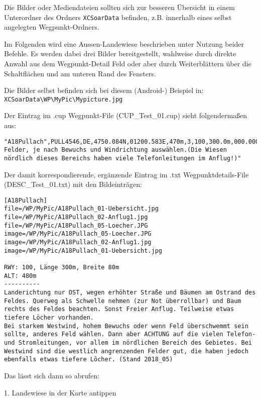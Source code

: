 Die Bilder oder Mediendateien sollten sich zur besseren Übersicht in einem Unterordner des Ordners \verb|XCSoarData| befinden, z.B. innerhalb eines selbst angelegten Wegpunkt-Ordners.



Im Folgenden wird eine Aussen-Landewiese beschrieben unter Nutzung beider Befehle. Es werden dabei drei Bilder bereitgestellt, wahlweise durch direkte Anwahl aus dem Wegpunkt-Detail Feld oder aber durch Weiterblättern über die Schaltflächen \button{$<$} und \button{$>$} am unteren Rand des Fensters. 

Die Bilder selbst befinden sich bei diesem (Android-) Beispiel in: \verb|XCSoarData\WP\MyPic\Mypicture.jpg| 

Der Eintrag im .cup Wegpunkt-File (CUP_Test_01.cup) sieht folgendermaßen aus:

\begin{verbatim}
"A18Pullach",PULL4546,DE,4750.084N,01200.583E,470m,3,100,300.0m,000.000,"Mehrere Felder, je nach Bewuchs und Windrichtung auswählen.(Die Wiesen nördlich dieses Bereichs haben viele Telefonleitungen im Anflug!)"
\end{verbatim}

Der damit korrespondierende, ergänzende Eintrag im .txt Wegpunktdetails-File (DESC_Test_01.txt) mit den Bildeinträgen:

\begin{verbatim}
[A18Pullach]
file=/WP/MyPic/A18Pullach_01-Uebersicht.jpg
file=/WP/MyPic/A18Pullach_02-Anflug1.jpg
file=/WP/MyPic/A18Pullach_05-Loecher.JPG
image=/WP/MyPic/A18Pullach_05-Loecher.JPG
image=/WP/MyPic/A18Pullach_02-Anflug1.jpg
image=/WP/MyPic/A18Pullach_01-Uebersicht.jpg

RWY: 100, Länge 300m, Breite 80m
ALT: 480m
----------
Landerichtung nur OST, wegen erhöhter Straße und Bäumen am Ostrand des Feldes. Querweg als Schwelle nehmen (zur Not überrollbar) und Baum rechts des Feldes beachten. Sonst Freier Anflug. Teilweise etwas tiefere Löcher vorhanden.
Bei starkem Westwind, hohem Bewuchs oder wenn Feld überschwemmt sein sollte, anderes Feld wählen. Dann aber ACHTUNG auf die vielen Telefon- und Stromleitungen, vor allem im nördlichen Bereich des Gebietes. Bei Westwind sind die westlich angrenzenden Felder gut, die haben jedoch ebenfalls etwas tiefere Löcher. (Stand 2018_05) 
\end{verbatim}

Das lässt sich dann so abrufen:

1. Landewiese in der Karte antippen

